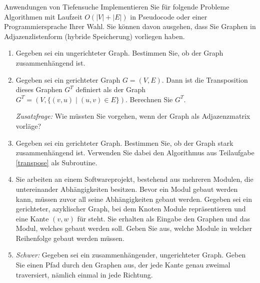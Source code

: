 \documentclass[11pt,a4paper]{article}
\begin{document}
\begin{aufgabe}{4}{Anwendungen von Tiefensuche}
    Implementieren Sie für folgende Probleme Algorithmen mit Laufzeit $O(|V| + |E|)$ in Pseudocode oder einer Programmiersprache Ihrer Wahl.
    Sie können davon ausgehen, dass Sie Graphen in Adjazenzlistenform (hybride Speicherung) vorliegen haben.
    \begin{enumerate}[label=\alph*)]
        \item \label{connected}
        Gegeben sei ein ungerichteter Graph.
        Bestimmen Sie, ob der Graph zusammenhängend ist.
        \item \label{transpose} Gegeben sei ein gerichteter Graph $G = (V, E)$. Dann ist die Transposition dieses Graphen $G^T$ definiert als der Graph $G^T = (V, \{(v, u) \mid (u, v) \in E\})$.
        Berechnen Sie $G^T$.
        
        \emph{Zusatzfrage:} Wie müssten Sie vorgehen, wenn der Graph als Adjazenzmatrix vorläge?
        \item 
        Gegeben sei ein gerichteter Graph.
        Bestimmen Sie, ob der Graph stark zusammenhängend ist.
        Verwenden Sie dabei den Algorithmus aus Teilaufgabe \ref*{transpose} als Subroutine.
        \item
        Sie arbeiten an einem Softwareprojekt, bestehend aus mehreren Modulen, die untereinander Abhängigkeiten besitzen.
        Bevor ein Modul gebaut werden kann, müssen zuvor all seine Abhängigkeiten gebaut werden.
        Gegeben sei ein gerichteter, azyklischer Graph, bei dem Knoten Module repräsentieren und eine Kante $(v, w)$ für  steht.
        Sie erhalten als Eingabe den Graphen und das Modul, welches gebaut werden soll.
        Geben Sie aus, welche Module in welcher Reihenfolge gebaut werden müssen.
        \item
        \emph{Schwer:} Gegeben sei ein zusammenhängender, ungerichteter Graph.
        Geben Sie einen Pfad durch den Graphen aus, der jede Kante genau zweimal traversiert, nämlich einmal in jede Richtung.
    \end{enumerate}
\end{aufgabe}
\end{document}
